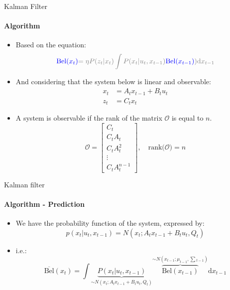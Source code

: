\documentclass[aspectratio=169]{beamer}
\begin{document}
\begin{frame}[c]{Kalman Filter}
    \framesubtitle{Algorithm}
    \begin{itemize}
        \item Based on the equation:
        \begin{equation*}
            \color{blue}{\text{Bel}}(x_t)  \color{gray}{=\eta P(z_t|x_t)\displaystyle\int P(x_t| u_t,x_{t-1})}\color{blue}{\color{blue}{\text{Bel}}(x_{t-1})}\color{gray}{)\text{d}x_{t-1}}
        \end{equation*}
        \item And considering that the system below is linear and observable:
          \begin{equation*}
            \begin{split}
                x_t &= A_t x_{t-1} + B_t u_t\\ 
                z_t &= C_t x_t
            \end{split}
        \end{equation*}
        \item A system is observable if the rank of the matrix $\mathcal {O}$ is equal to $n$.
        \begin{equation*}
            \mathcal {O}={\begin{bmatrix}C_t\\C_tA_t\\C_tA^{2}_t\\\vdots \\C_tA^{n-1}_t\end{bmatrix}, \quad \text{rank}(\mathcal {O}}) = n
        \end{equation*}
    \end{itemize}
\end{frame}

\begin{frame}[c]{Kalman filter}
    \framesubtitle{Algorithm - Prediction}
    \begin{itemize}
        \item We have the probability function of the system, expressed by:
        \begin{equation*}
            p(x_t| u_t, x_{t-1})= N\left(x_t; A_tx_{t-1}+ B_tu_t, Q_t\right)
        \end{equation*}   
        \item i.e.:
        \begin{equation*}
            \overline{\text{Bel}}(x_t)  = \displaystyle\int\underbrace{P(x_t|u_t, x_{t-1})}_{\sim N\left(x_t; A_t x_{t-1}+ B_tu_t, Q_t\right)} \overbrace{\text{Bel}(x_{t-1})}^{\sim N\left(x_{t-1}; \mu_{t-1}, \textstyle\sum {}_{t-1}\right)}\text{d}x_{t-1}
        \end{equation*}
    \end{itemize}
\end{frame}
\end{document}

